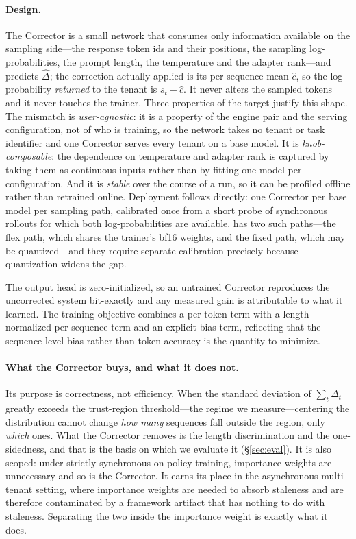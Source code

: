 \paragraph{Design.} The Corrector is a small network that consumes only information
available on the sampling side---the response token ids and their positions, the
sampling log-probabilities, the prompt length, the temperature and the adapter
rank---and predicts $\widehat{\Delta}$; the correction actually applied is
its per-sequence mean $\hat{c}$, so the log-probability \emph{returned} to the tenant is
$s_t - \hat{c}$. It never alters the sampled tokens and it never touches the trainer.
Three properties of the target justify this shape. The mismatch is \emph{user-agnostic}:
it is a property of the engine pair and the serving configuration, not of who is
training, so the network takes no tenant or task identifier and one Corrector serves
every tenant on a base model. It is \emph{knob-composable}: the dependence on
temperature and adapter rank is captured by taking them as continuous inputs rather than
by fitting one model per configuration. And it is \emph{stable} over the course of a
run, so it can be profiled offline rather than retrained online. Deployment follows
directly: one Corrector per base model per sampling path, calibrated once from a short
probe of synchronous rollouts for which both log-probabilities are available. \sysname
has two such paths---the flex path, which shares the trainer's bf16 weights, and the
fixed path, which may be quantized---and they require separate calibration precisely
because quantization widens the gap.

The output head is zero-initialized, so an untrained Corrector reproduces the
uncorrected system bit-exactly and any measured gain is attributable to what it learned.
The training objective combines a per-token term with a length-normalized per-sequence
term and an explicit bias term, reflecting that the sequence-level bias rather than
token accuracy is the quantity to minimize.

\paragraph{What the Corrector buys, and what it does not.} Its purpose is correctness,
not efficiency. When the standard deviation of $\sum_t \Delta_t$ greatly exceeds the
trust-region threshold---the regime we measure---centering the distribution cannot
change \emph{how many} sequences fall outside the region, only \emph{which} ones. What
the Corrector removes is the length discrimination and the one-sidedness, and that is
the basis on which we evaluate it (\S\ref{sec:eval}). It is also scoped: under strictly
synchronous on-policy training, importance weights are unnecessary and so is the
Corrector. It earns its place in the asynchronous multi-tenant setting, where importance
weights are needed to absorb staleness and are therefore contaminated by a framework
artifact that has nothing to do with staleness. Separating the two inside the importance
weight is exactly what it does.

